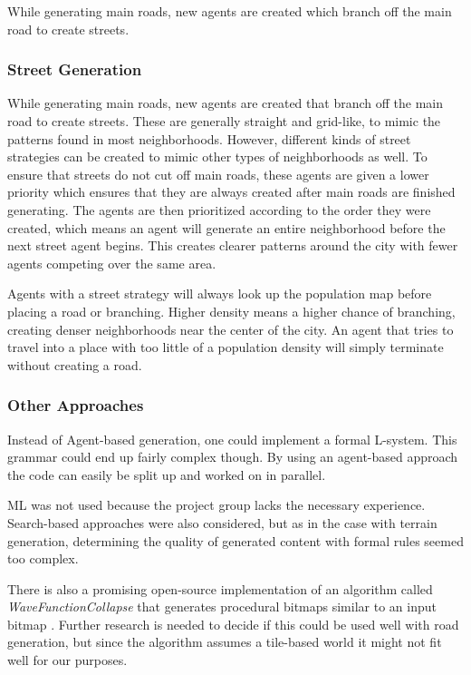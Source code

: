 While generating main roads, new agents are created which branch off the main road to create streets.

\subsubsection{Street Generation}
While generating main roads, new agents are created that branch off the main road to create streets.
These are generally straight and grid-like, to mimic the patterns found in most neighborhoods.
However, different kinds of street strategies can be created to mimic other types of neighborhoods as well.
To ensure that streets do not cut off main roads, these agents are given a lower priority which ensures that they are always created after main roads are finished generating.
The agents are then prioritized according to the order they were created, which means an agent will generate an entire neighborhood before the next street agent begins.
This creates clearer patterns around the city with fewer agents competing over the same area.

Agents with a street strategy will always look up the population map before placing a road or branching.
Higher density means a higher chance of branching, creating denser neighborhoods near the center of the city.
An agent that tries to travel into a place with too little of a population density will simply terminate without creating a road. 

\subsubsection{Other Approaches}

Instead of Agent-based generation, one could implement a formal L-system.
This grammar could end up fairly complex though.
By using an agent-based approach the code can easily be split up and worked on in parallel.

ML was not used because the project group lacks the necessary experience.
Search-based approaches were also considered, but as in the case with terrain generation, determining the quality of generated content with formal rules seemed too complex.

There is also a promising open-source implementation of an algorithm called \textit{WaveFunctionCollapse} that generates procedural bitmaps similar to an input bitmap \cite{wavefunc}.
Further research is needed to decide if this could be used well with road generation, but since the algorithm assumes a tile-based world it might not fit well for our purposes.